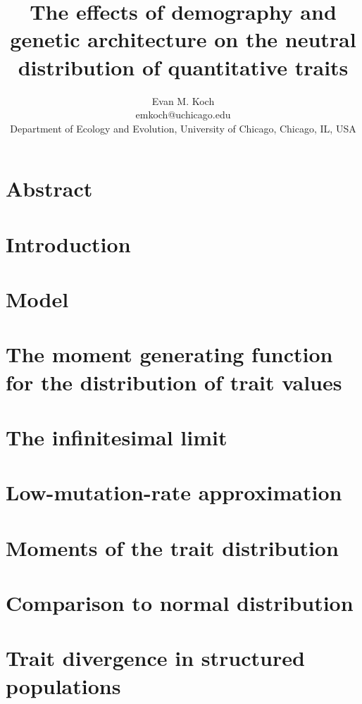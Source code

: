 \documentclass{article}
\begin{document}
\title{The effects of demography and genetic architecture on the neutral distribution of quantitative traits}
\author{Evan M. Koch \\ emkoch@uchicago.edu \\
  Department of Ecology and Evolution, University of Chicago, Chicago, IL, USA}
\maketitle

\section{Abstract}

\section{Introduction}

\section{Model}

\section{The moment generating function for the distribution of trait values}

\section{The infinitesimal limit}

\section{Low-mutation-rate approximation}

\section{Moments of the trait distribution}

\section{Comparison to normal distribution}

\section{Trait divergence in structured populations}

\end{document}
